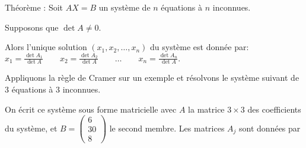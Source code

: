 Théorème : Soit $AX = B$ un système de $n$ équations  à $n$ inconnues. 

\change
Supposons que $\det A \neq 0$.

\change
Alors l'unique solution $(x_1,x_2,\ldots,x_n)$ du système est donnée par:\\

$
x_1 = \frac{\det A_1}{\det A} \qquad x_2 = \frac{\det A_2}{\det A} \qquad \ldots \qquad x_n = \frac{\det A_n}{\det A}.
$

% 
% 
% 
% 
% 
% 
% 
% 
% 
% 
% 
% 

\diapo

Appliquons la règle de Cramer sur un exemple et résolvons le système suivant de 3 équations à 3 inconnues.

\change
On écrit ce système sous forme matricielle avec $A$ la matrice $3\times3$ des coefficients du système, et
$
B = \left(
\begin{array}{c} 6 \\ 30 \\ 8 \end{array}\right)
$
le second membre. Les matrices $A_j$ sont données par

